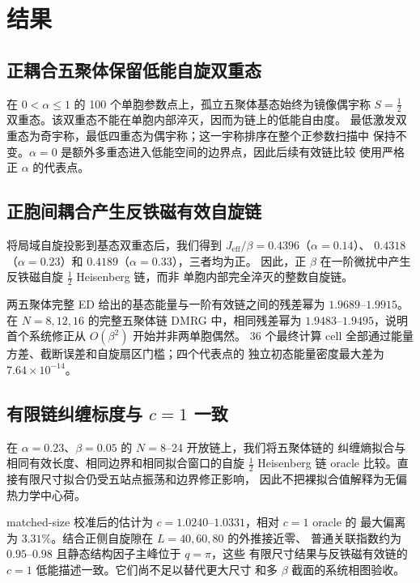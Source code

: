\section{结果}

\subsection{正耦合五聚体保留低能自旋双重态}

在 $0<\alpha\leq1$ 的 100 个单胞参数点上，孤立五聚体基态始终为镜像偶宇称
$S=\frac12$ 双重态。该双重态不能在单胞内部淬灭，因而为链上的低能自由度。
最低激发双重态为奇宇称，最低四重态为偶宇称；这一宇称排序在整个正参数扫描中
保持不变。$\alpha=0$ 是额外多重态进入低能空间的边界点，因此后续有效链比较
使用严格正 $\alpha$ 的代表点。

\subsection{正胞间耦合产生反铁磁有效自旋链}

将局域自旋投影到基态双重态后，我们得到
$J_{\mathrm{eff}}/\beta=0.4396$（$\alpha=0.14$）、
$0.4318$（$\alpha=0.23$）和 $0.4189$（$\alpha=0.33$），三者均为正。
因此，正 $\beta$ 在一阶微扰中产生反铁磁自旋 $\frac12$ Heisenberg 链，而非
单胞内部完全淬灭的整数自旋链。

两五聚体完整 ED 给出的基态能量与一阶有效链之间的残差幂为
$1.9689$--$1.9915$。在 $N=8,12,16$ 的完整五聚体链 DMRG 中，相同残差幂为
$1.9483$--$1.9495$，说明首个系统修正从 $O(\beta^2)$ 开始并非两单胞偶然。
36 个最终计算 cell 全部通过能量方差、截断误差和自旋扇区门槛；四个代表点的
独立初态能量密度最大差为 $7.64\times10^{-14}$。

\subsection{有限链纠缠标度与 $c=1$ 一致}

在 $\alpha=0.23$、$\beta=0.05$ 的 $N=8$--24 开放链上，我们将五聚体链的
纠缠熵拟合与相同有效长度、相同边界和相同拟合窗口的自旋 $\frac12$
Heisenberg 链 oracle 比较。直接有限尺寸拟合仍受五站点振荡和边界修正影响，
因此不把裸拟合值解释为无偏热力学中心荷。

matched-size 校准后的估计为 $c=1.0240$--$1.0331$，相对 $c=1$ oracle 的
最大偏离为 $3.31\%$。结合正侧自旋隙在 $L=40,60,80$ 的外推接近零、
普通关联指数约为 $0.95$--$0.98$ 且静态结构因子主峰位于 $q=\pi$，这些
有限尺寸结果与反铁磁有效链的 $c=1$ 低能描述一致。它们尚不足以替代更大尺寸
和多 $\beta$ 截面的系统相图验收。

